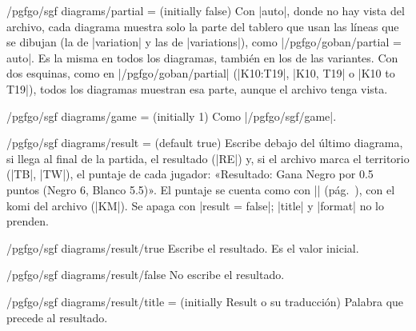 \begin{key}{/pgfgo/sgf diagrams/partial =  (initially false)}
	Con |auto|, donde no hay vista del archivo, cada diagrama muestra solo la parte del tablero que usan las líneas que se dibujan (la de |variation| y las de |variations|), como |/pgfgo/goban/partial = auto|. Es la misma en todos los diagramas, también en los de las variantes. Con dos esquinas, como en |/pgfgo/goban/partial| (|K10:T19|, |{K10, T19}| o |{K10 to T19}|), todos los diagramas muestran esa parte, aunque el archivo tenga vista.

	\begin{codeexample}
	\end{codeexample}
\end{key}

\begin{key}{/pgfgo/sgf diagrams/game =  (initially 1)}
	Como |/pgfgo/sgf/game|.
\end{key}

\begin{key}{/pgfgo/sgf diagrams/result =  (default true)}
	Escribe debajo del último diagrama, si llega al final de la partida, el resultado (|RE|) y, si el archivo marca el territorio (|TB|, |TW|), el puntaje de cada jugador: «Resultado: Gana Negro por 0.5 puntos (Negro 6, Blanco 5.5)». El puntaje se cuenta como con |\pgfgoscore| (pág.~\pageref{subsec:territorio}), con el komi del archivo (|KM|). Se apaga con |result = false|; |title| y |format| no lo prenden.
\end{key}

\begin{stylekey}{/pgfgo/sgf diagrams/result/true}
	Escribe el resultado. Es el valor inicial.
\end{stylekey}

\begin{stylekey}{/pgfgo/sgf diagrams/result/false}
	No escribe el resultado.
\end{stylekey}

\begin{key}{/pgfgo/sgf diagrams/result/title =  (initially Result o su traducción)}
	Palabra que precede al resultado.
\end{key}

